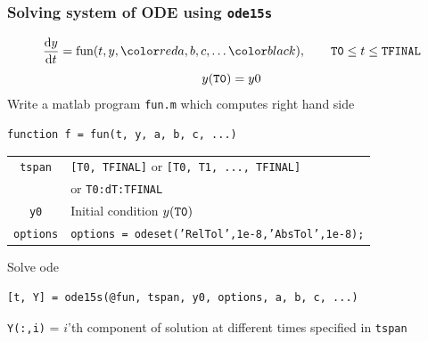 \documentclass[11pt,xcolor=svgnames,onlymath]{beamer}
\begin{document}
\begin{frame}
\frametitle{Solving system of ODE using {\tt ode15s}}
\[
\dd{y}{t} = \mbox{fun}(t, y, \clr{red}{a, b, c, \ldots}), \qquad {\tt T0} \le t \le {\tt TFINAL}
\]
\[
y({\tt T0}) = y0
\]
Write a matlab program {\tt fun.m} which computes right hand side
\begin{lstlisting}
function f = fun(t, y, a, b, c, ...)
\end{lstlisting}
\begin{center}
\begin{tabular}{|c|l|}
\hline
{\tt tspan} & {\tt [T0, TFINAL]} or {\tt [T0, T1, ..., TFINAL]} \\
& or {\tt T0:dT:TFINAL} \\
\hline
{\tt y0} & Initial condition $y({\tt T0})$ \\
\hline
{\tt options} &  {\tt options = odeset('RelTol',1e-8,'AbsTol',1e-8);} \\
\hline
\end{tabular}
\end{center}

Solve ode
\begin{lstlisting}
[t, Y] = ode15s(@fun, tspan, y0, options, a, b, c, ...)
\end{lstlisting}

\begin{center}
{\tt Y(:,i)} = $i$'th component of solution at different times specified in {\tt tspan}
\end{center}

\end{frame}
\end{document}
